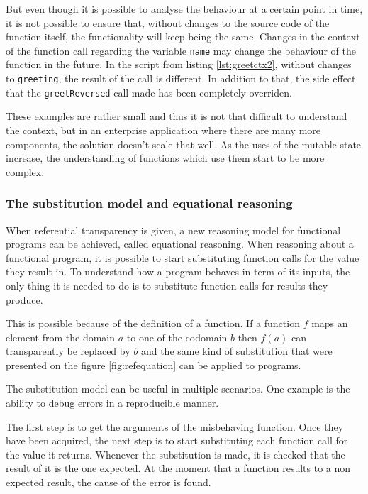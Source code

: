 \documentclass[../main.tex]{subfiles}
\begin{document}
But even though it is possible to analyse the behaviour at a certain point in
time, it is not possible to ensure that, without changes to the source code of the
function itself, the functionality will keep being the same. Changes in the context
of the function call regarding the variable \texttt{name} may change the behaviour of
the function in the future. In the script from listing \ref{lst:greetctx2},
without changes to \texttt{greeting}, the result of the call is different. In
addition to that, the side effect that the \texttt{greetReversed} call made has
been completely overriden.



These examples are rather small and thus it is not that difficult to understand
the context, but in an enterprise application where there are many more
components, the solution doesn't scale that well. As the uses of the mutable
state increase, the understanding of functions which use them start to be more
complex.

\subsubsection{The substitution model and equational reasoning}

When referential transparency is given, a new reasoning model for functional
programs can be achieved, called equational reasoning. When reasoning about a
functional program, it is possible to start substituting function calls for the
value they result in. To understand how a program behaves in term of its inputs,
the only thing it is needed to do is to substitute function calls for results they
produce.

This is possible because of the definition of a function. If a function $f$ maps an
element from the domain $a$ to one of the codomain $b$ then $f(a)$ can
transparently be replaced by $b$ and the same kind of substitution that were
presented on the figure \ref{fig:refequation} can be applied to programs.

The substitution model can be useful in multiple scenarios. One example is the
ability to debug errors in a reproducible manner.

The first step is to get the arguments of the misbehaving function. Once they have been acquired, the next step is to
start substituting each function call for the value it returns. Whenever the
substitution is made, it is checked that the result of it is the one expected. At the
moment that a function results to a non expected result, the cause of the error
is found.
\end{document}
